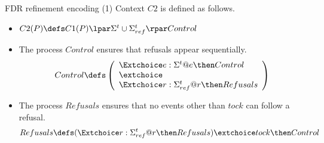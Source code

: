 \documentclass[fleqn]{beamer}
\newenvironment{slide-nocite}[1]
{\begin{frame}[fragile,environment=slide-nocite]
\frametitle{#1}\begin{refsegment}}
{\end{refsegment}\end{frame}}%
\begin{document}
\begin{slide-nocite}{FDR refinement encoding (1)}
Context $C2$ is defined as follows.
\begin{itemize}
  \item $C2(P) \circdef C1(P) \lpar \Sigma^{t} \cup \Sigma^{t}_{ref} \rpar Control$
  \item The process $Control$ ensures that refusals appear sequentially.
   \begin{align*}
      Control \circdef \left(\begin{array}{l}
        \Extchoice e : \Sigma^{t} @ e \then Control
        \\ \extchoice \\
        \Extchoice r : \Sigma^{t}_{ref} @ r \then Refusals
      \end{array}\right)
    \end{align*}
  \item The process $Refusals$ ensures that no events other than $tock$ can follow
    a refusal.
    \begin{align*}
      Refusals \circdef (\Extchoice r : \Sigma^{t}_{ref} @ r \then Refusals) \extchoice tock \then Control
    \end{align*}
\end{itemize}
\end{slide-nocite}
\end{document}
